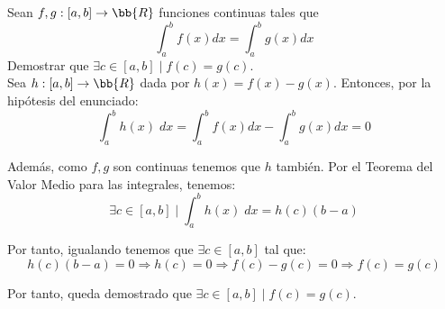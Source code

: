 \begin{ejercicio}
    Sean $f,g:[a,b]\to \bb{R}$ funciones continuas tales que
    \begin{equation*}
        \int_a^b f(x)dx = \int_a^b g(x)dx
    \end{equation*}
    Demostrar que $\exists c\in [a,b]\mid f(c)=g(c)$.\\

    Sea $h:[a,b]\to \bb{R}$ dada por $h(x)=f(x)-g(x)$. Entonces, por la hipótesis del enunciado:
    \begin{equation*}
        \int_a^b h(x)\;dx = \int_a^b f(x)dx - \int_a^b g(x)dx = 0
    \end{equation*}

    Además, como $f,g$ son continuas tenemos que $h$ también. Por el Teorema del Valor Medio para las integrales, tenemos:
    \begin{equation*}
        \exists c\in [a,b] \mid \int_a^b h(x)\;dx = h(c)(b-a)
    \end{equation*}

    Por tanto, igualando tenemos que $\exists c\in [a,b]$ tal que:
    \begin{equation*}
        h(c)(b-a) = 0 \Longrightarrow h(c) = 0 \Longrightarrow f(c)-g(c) = 0 \Longrightarrow f(c)=g(c)
    \end{equation*}

    Por tanto, queda demostrado que $\exists c\in [a,b]\mid f(c)=g(c)$.
\end{ejercicio}

